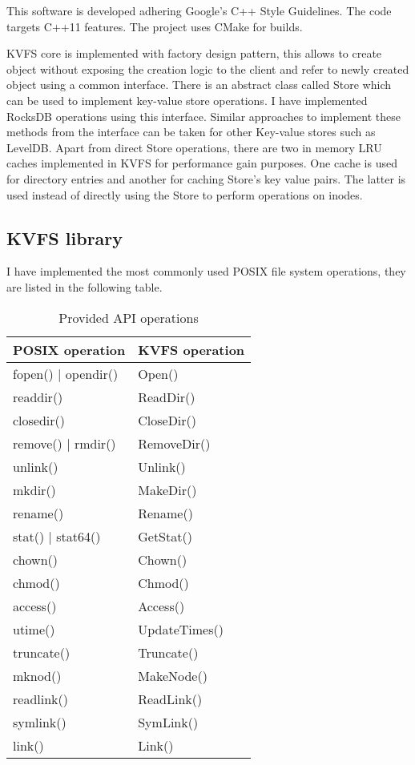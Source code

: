 \documentclass[bsc,frontabs,twoside,singlespacing,parskip,deptreport]{infthesis}     %
\begin{document}
This software is developed adhering Google's C++ Style Guidelines. The code targets C++11 features.
The project uses CMake for builds.

KVFS core is implemented with factory design pattern, this allows to create object without exposing the creation logic to the client and refer to newly created object using a common interface. There is an abstract class called Store which can be used to implement key-value store operations. I have implemented RocksDB operations using this interface. Similar approaches to implement these methods from the interface can be taken for other Key-value stores such as LevelDB.
Apart from direct Store operations, there are two in memory LRU caches implemented in KVFS for performance gain purposes. One cache is used for directory entries and another for caching Store's key value pairs. The latter is used instead of directly using the Store to perform operations on inodes.


\subsection{KVFS library}
I have implemented the most commonly used POSIX file system operations, they are listed in the following table.
\begin{table}[h!]
	\begin{center}
		\caption{Provided API operations}
		\label{tab:method_table}
		\begin{tabular}{l|l}
			\textbf{POSIX operation} & \textbf{KVFS operation} \\
			\hline
			fopen() | opendir() & Open() \\
			readdir() & ReadDir() \\
			closedir() & CloseDir() \\
			remove() | rmdir() & RemoveDir() \\
			unlink() & Unlink() \\
			mkdir() & MakeDir() \\
			rename() & Rename() \\
			stat() | stat64() & GetStat() \\
			chown() & Chown() \\
			chmod() & Chmod() \\
			access() & Access() \\
			utime() & UpdateTimes() \\
			truncate() & Truncate() \\
			mknod() & MakeNode() \\
			readlink() & ReadLink() \\
			symlink() & SymLink() \\
			link() & Link() \\
		\end{tabular}			
	\end{center}
\end{table}
\end{document}
